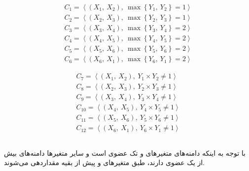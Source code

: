 \documentclass{article}
\begin{document}
\begin{fleqn}
\begin{equation}
\begin{aligned}
C_{1} = \left\langle \left( X_{1},\: X_{2} \right),\: \max\left\{ Y_{1},\: Y_{2} \right\} = 1 \right\rangle \\
C_{2} = \left\langle \left( X_{2},\: X_{3} \right),\: \max\left\{ Y_{2},\: Y_{3} \right\} = 1 \right\rangle \\
C_{3} = \left\langle \left( X_{3},\: X_{4} \right),\: \max\left\{ Y_{3},\: Y_{4} \right\} = 2 \right\rangle \\
C_{4} = \left\langle \left( X_{4},\: X_{5} \right),\: \max\left\{ Y_{4},\: Y_{5} \right\} = 2 \right\rangle \\
C_{5} = \left\langle \left( X_{5},\: X_{6} \right),\: \max\left\{ Y_{5},\: Y_{6} \right\} = 2 \right\rangle \\
C_{6} = \left\langle \left( X_{6},\: X_{1} \right),\: \max\left\{ Y_{6},\: Y_{1} \right\} = 2 \right\rangle
\end{aligned}
\end{equation}

\begin{equation}
\begin{aligned}
C_{7} = \left\langle \left( X_{1},\: X_{2} \right),\: Y_{1} \times Y_{2} \neq 1 \right\rangle \\
C_{8} = \left\langle \left( X_{2},\: X_{3} \right),\: Y_{2} \times Y_{3} \neq 1 \right\rangle \\
C_{9} = \left\langle \left( X_{3},\: X_{4} \right),\: Y_{3} \times Y_{4} \neq 1 \right\rangle \\
C_{10} = \left\langle \left( X_{4},\: X_{5} \right),\: Y_{4} \times Y_{5} \neq 1 \right\rangle \\
C_{11} = \left\langle \left( X_{5},\: X_{6} \right),\: Y_{5} \times Y_{6} \neq 1 \right\rangle \\
C_{12} = \left\langle \left( X_{6},\: X_{1} \right),\: Y_{6} \times Y_{1} \neq 1 \right\rangle
\end{aligned}
\end{equation}
\end{fleqn}







\subsection{}
\subsection{}
با توجه به اینکه دامنه‌های متغیرهای  و  تک عضوی است و سایر متغیرها دامنه‌های بیش از یک عضوی دارند، طبق  متغیرهای  و  پیش از بقیه مقداردهی می‌شوند.
\end{document}
